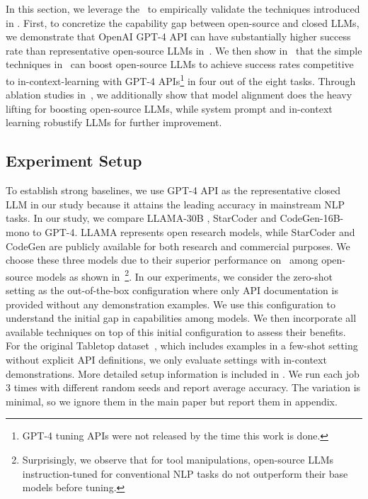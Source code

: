 In this section, we leverage the \snact\  to empirically validate the techniques introduced in . First, to concretize the capability gap between open-source and closed LLMs, we demonstrate that OpenAI GPT-4 API can have substantially higher success rate than representative open-source LLMs in~. 
We then show in~ that the simple techniques in~ can boost open-source LLMs to achieve success rates competitive to in-context-learning with GPT-4 APIs\footnote{GPT-4 tuning APIs were not released by the time this work is done.} in four out of the eight tasks.
Through ablation studies in~, we additionally show that model alignment does the heavy lifting for boosting open-source LLMs, while system prompt and in-context learning robustify LLMs for further improvement. 

\subsection{Experiment Setup}
To establish strong baselines, we use GPT-4 API as the representative closed LLM in our study because it attains the leading accuracy in mainstream NLP tasks. 
In our study, we compare LLAMA-30B \cite{touvron2023llama}, StarCoder \cite{li2023starcoder} and CodeGen-16B-mono \cite{nijkamp2022codegen} to GPT-4. LLAMA represents open research models, while StarCoder and CodeGen are publicly available for both research and commercial purposes. We choose these three models due to their superior performance on \snact\  among open-source models as shown in~\footnote{Surprisingly, we observe that for tool manipulations, open-source LLMs instruction-tuned for conventional NLP tasks do not outperform their base models before tuning.}. 
In our experiments, we consider the zero-shot setting as the out-of-the-box configuration where only API documentation is provided without any demonstration examples. We use this configuration to understand the initial gap in capabilities among models. We then incorporate all available techniques on top of this initial configuration to assess their benefits. 
For the original Tabletop dataset~\cite{liang2022code}, which includes examples in a few-shot setting without explicit API definitions, we only evaluate settings with in-context demonstrations. 
More detailed setup information is included in . We run each job 3 times with different random seeds and report average accuracy. The variation is minimal, so we ignore them in the main paper but report them in appendix.





